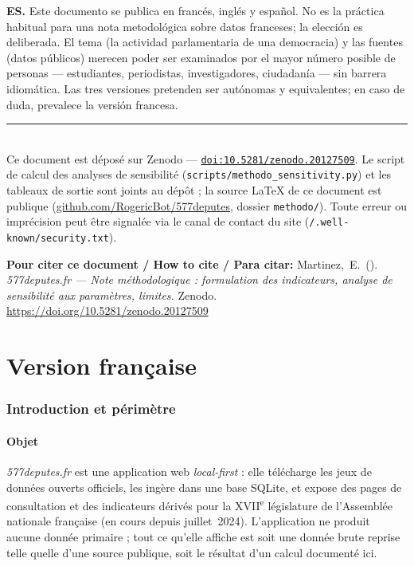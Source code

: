 \documentclass[11pt,a4paper]{article}
\newcommand{\code}[1]{\texttt{\small #1}}
\begin{document}
\textbf{ES.} Este documento se publica en francés, inglés y español. No es la
práctica habitual para una nota metodológica sobre datos franceses; la elección
es deliberada. El tema (la actividad parlamentaria de una democracia) y las
fuentes (datos públicos) merecen poder ser examinados por el mayor número posible
de personas — estudiantes, periodistas, investigadores, ciudadanía — sin barrera
idiomática. Las tres versiones pretenden ser autónomas y equivalentes; en caso de
duda, prevalece la versión francesa.
\normalsize

\vfill
\noindent\rule{\linewidth}{0.4pt}\\
\small Ce document est déposé sur Zenodo —
\href{https://doi.org/10.5281/zenodo.20127509}{\texttt{doi:10.5281/zenodo.20127509}}.
Le script de calcul des analyses de sensibilité (\code{scripts/methodo\_sensitivity.py})
et les tableaux de sortie sont joints au dépôt ; la source LaTeX de ce document est
publique (\href{https://github.com/RogericBot/577deputes}{github.com/RogericBot/577deputes},
dossier \code{methodo/}). Toute erreur ou imprécision peut être signalée via le canal
de contact du site (\code{/.well-known/security.txt}).

\par\medskip\noindent\textbf{Pour citer ce document / How to cite / Para citar:}
Martinez,~E.\ (\the\year). \emph{577deputes.fr — Note méthodologique : formulation des
indicateurs, analyse de sensibilité aux paramètres, limites.} Zenodo.
\href{https://doi.org/10.5281/zenodo.20127509}{https://doi.org/10.5281/zenodo.20127509}
\normalsize

\clearpage
\tableofcontents
\clearpage

\part{Version française}

\section{Introduction et périmètre}

\subsection{Objet}
\emph{577deputes.fr} est une application web \emph{local-first} : elle télécharge
les jeux de données ouverts officiels, les ingère dans une base SQLite, et expose
des pages de consultation et des indicateurs dérivés pour la XVII\textsuperscript{e}
législature de l'Assemblée nationale française (en cours depuis juillet~2024).
L'application ne produit aucune donnée primaire ; tout ce qu'elle affiche est soit
une donnée brute reprise telle quelle d'une source publique, soit le résultat d'un
calcul documenté ici.
\end{document}
